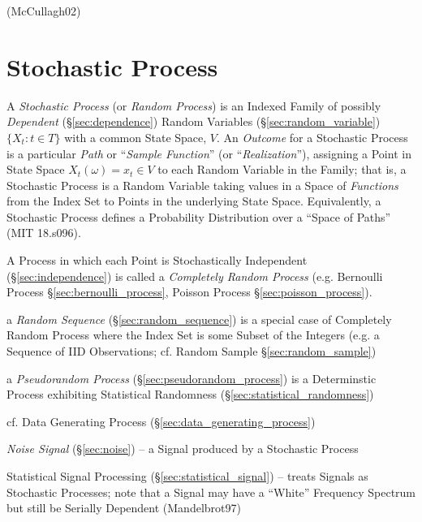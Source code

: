 (McCullagh02)



\section{Stochastic Process}\label{sec:stochastic_process}

A \emph{Stochastic Process} (or \emph{Random Process}) is an Indexed Family of
possibly \emph{Dependent} (\S\ref{sec:dependence}) Random Variables
(\S\ref{sec:random_variable}) $\{ X_t : t \in T \}$ with a common State Space,
$V$. An \emph{Outcome} for a Stochastic Process is a particular \emph{Path} or
``\emph{Sample Function}'' (or ``\emph{Realization}''), assigning a Point in
State Space $X_t(\omega) = x_t \in V$ to each Random Variable in the Family;
that is, a Stochastic Process is a Random Variable taking values in a Space of
\emph{Functions} from the Index Set to Points in the underlying State Space.
Equivalently, a Stochastic Process defines a Probability Distribution over a
``Space of Paths'' (MIT 18.s096).

A Process in which each Point is Stochastically Independent
(\S\ref{sec:independence}) is called a \emph{Completely Random Process} (e.g.
Bernoulli Process \S\ref{sec:bernoulli_process}, Poisson Process
\S\ref{sec:poisson_process}).

\fist a \emph{Random Sequence} (\S\ref{sec:random_sequence}) is a special case
of Completely Random Process where the Index Set is some Subset of the Integers
(e.g. a Sequence of IID Observations; cf. Random Sample
\S\ref{sec:random_sample})

\fist a \emph{Pseudorandom Process} (\S\ref{sec:pseudorandom_process}) is a
Determinstic Process exhibiting Statistical Randomness
(\S\ref{sec:statistical_randomness})

\fist cf. Data Generating Process (\S\ref{sec:data_generating_process})

\fist \emph{Noise Signal} (\S\ref{sec:noise}) -- a Signal produced by a
Stochastic Process

\fist Statistical Signal Processing (\S\ref{sec:statistical_signal}) -- treats
Signals as Stochastic Processes;
note that a Signal may have a ``White'' Frequency Spectrum but still be Serially
Dependent (Mandelbrot97)

